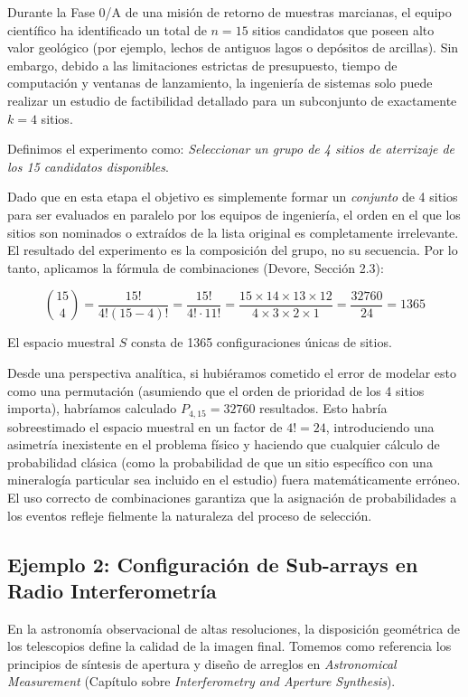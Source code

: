 Durante la Fase 0/A de una misión de retorno de muestras marcianas, el equipo científico ha identificado un total de $n = 15$ sitios candidatos que poseen alto valor geológico (por ejemplo, lechos de antiguos lagos o depósitos de arcillas). Sin embargo, debido a las limitaciones estrictas de presupuesto, tiempo de computación y ventanas de lanzamiento, la ingeniería de sistemas solo puede realizar un estudio de factibilidad detallado para un subconjunto de exactamente $k = 4$ sitios.

Definimos el experimento como: \textit{Seleccionar un grupo de 4 sitios de aterrizaje de los 15 candidatos disponibles}. 

Dado que en esta etapa el objetivo es simplemente formar un \textit{conjunto} de 4 sitios para ser evaluados en paralelo por los equipos de ingeniería, el orden en el que los sitios son nominados o extraídos de la lista original es completamente irrelevante. El resultado del experimento es la composición del grupo, no su secuencia. Por lo tanto, aplicamos la fórmula de combinaciones (Devore, Sección 2.3):

$$ \binom{15}{4} = \frac{15!}{4!(15-4)!} = \frac{15!}{4! \cdot 11!} = \frac{15 \times 14 \times 13 \times 12}{4 \times 3 \times 2 \times 1} = \frac{32760}{24} = 1365 $$

El espacio muestral $S$ consta de 1365 configuraciones únicas de sitios. 

Desde una perspectiva analítica, si hubiéramos cometido el error de modelar esto como una permutación (asumiendo que el orden de prioridad de los 4 sitios importa), habríamos calculado $P_{4,15} = 32760$ resultados. Esto habría sobreestimado el espacio muestral en un factor de $4! = 24$, introduciendo una asimetría inexistente en el problema físico y haciendo que cualquier cálculo de probabilidad clásica (como la probabilidad de que un sitio específico con una mineralogía particular sea incluido en el estudio) fuera matemáticamente erróneo. El uso correcto de combinaciones garantiza que la asignación de probabilidades a los eventos refleje fielmente la naturaleza del proceso de selección.

\subsection{Ejemplo 2: Configuración de Sub-arrays en Radio Interferometría}

En la astronomía observacional de altas resoluciones, la disposición geométrica de los telescopios define la calidad de la imagen final. Tomemos como referencia los principios de síntesis de apertura y diseño de arreglos en \textit{Astronomical Measurement} (Capítulo sobre \textit{Interferometry and Aperture Synthesis}).


